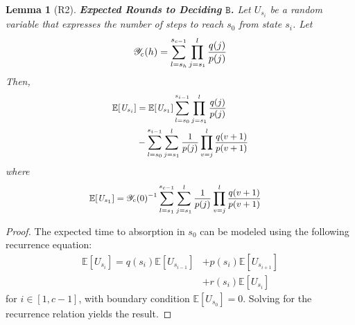 \documentclass[letterpaper,twocolumn,10pt]{article}
\newcommand{\tronly}[2]{#1}
\newtheorem{lemma}[theorem]{Lemma}
\theoremstyle{definition}
\begin{document}
\begin{appendices}
\tronly{
\begin{lemma}[R2]
\label{lemma:expected_absorption}
\textbf{Expected Rounds to Deciding $\mathtt{B}$.} Let $\mathit{U}_{s_i}$ be a random variable that expresses the number of steps to reach $s_0$ from state $s_i$.
Let
\begin{equation}
    \small
    \mathscr{Y}_c(h) = \sum_{l = s_h}^{s_{c-1}}\prod_{j = s_1}^{l}\frac{q(j)}{p(j)}
\end{equation}
Then,
\begin{equation}
\small
\begin{split}
    \mathbb{E}[\mathit{U}_{s_i}] &= \mathbb{E}[\mathit{U}_{s_1}]\sum_{l=s_0}^{s_{i-1}}\prod_{j = s_1}^{l}\frac{q(j)}{p(j)}\\
    &- \sum_{l=s_0}^{s_{i-1}}\sum_{j=s_1}^{l}\frac{1}{p(j)}\prod_{v=j}^{l}\frac{q(v+1)}{p(v+1)}
\end{split}
\label{equation:expected_convergence}
\end{equation}
where
\begin{equation}
\small
\begin{split}
    \mathbb{E}[\mathit{U}_{s_1}] &= \mathscr{Y}_c(0)^{-1}\sum_{l=s_1}^{s_{c-1}}\sum_{j=s_1}^{l}\frac{1}{p(j)}\prod_{v=j}^{l}\frac{q(v+1)}{p(v+1)}
\end{split}
\end{equation}
\end{lemma}
\begin{proof}
The expected time to absorption in $s_0$ can be modeled using the following recurrence
equation:
\begin{align}
        \mathbb{E}[\mathit{U}_{s_i}] = q(s_i)\mathbb{E}[\mathit{U}_{s_{i-1}}] &+ p(s_i)\mathbb{E}[\mathit{U}_{s_{i+1}}]\nonumber \\
        &+ r(s_i)\mathbb{E}[\mathit{U}_{s_{i}}]
\end{align}
for $i \in [1, c-1]$, with boundary condition $\mathbb{E}[\mathit{U}_{s_0}] = 0$. 
Solving for the recurrence relation yields the result. 
\end{proof}
}{}



\end{appendices}
\end{document}
